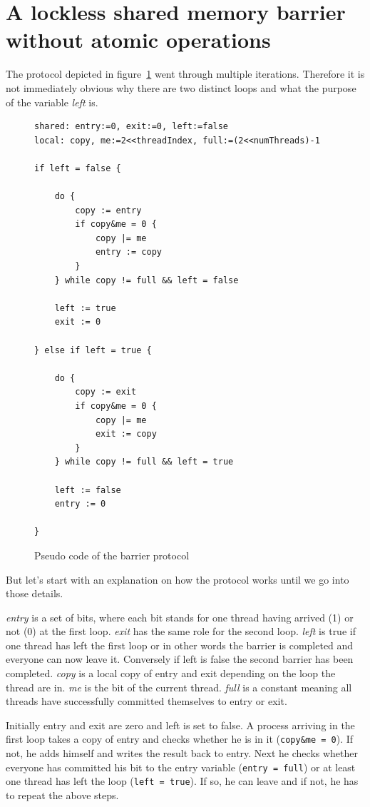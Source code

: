\documentclass[a4paper, 10pt]{article}
\begin{document}
\section{A lockless shared memory barrier without atomic operations}
The protocol depicted in figure~\ref{fig:barrier-source-code} went through multiple iterations. Therefore it is not immediately obvious why there are two distinct loops and what the purpose of the variable \emph{left} is.
\begin{figure}[htbp]
	\centering
	\begin{lstlisting}
shared: entry:=0, exit:=0, left:=false
local: copy, me:=2<<threadIndex, full:=(2<<numThreads)-1

if left = false {

	do {
		copy := entry
		if copy&me = 0 {
			copy |= me
			entry := copy
		}
	} while copy != full && left = false

	left := true
	exit := 0

} else if left = true {

	do {
		copy := exit
		if copy&me = 0 {
			copy |= me
			exit := copy
		}
	} while copy != full && left = true

	left := false
	entry := 0

}
	\end{lstlisting}
	\caption{Pseudo code of the barrier protocol}
	\label{fig:barrier-source-code}
\end{figure}
But let's start with an explanation on how the protocol works until we go into those details.

\emph{entry} is a set of bits, where each bit stands for one thread having arrived (1) or not (0) at the first loop. \emph{exit} has the same role for the second loop. \emph{left} is true if one thread has left the first loop or in other words the barrier is completed and everyone can now leave it. Conversely if left is false the second barrier has been completed. \emph{copy} is a local copy of entry and exit depending on the loop the thread are in. \emph{me} is the bit of the current thread. \emph{full} is a constant meaning all threads have successfully committed themselves to entry or exit.

Initially entry and exit are zero and left is set to false. A process arriving in the first loop takes a copy of entry and checks whether he is in it (\texttt{copy\&me = 0}). If not, he adds himself and writes the result back to entry. Next he checks whether everyone has committed his bit to the entry variable (\texttt{entry = full}) or at least one thread has left the loop (\texttt{left = true}). If so, he can leave and if not, he has to repeat the above steps.
\end{document}
